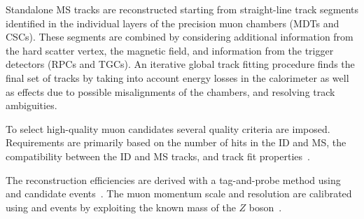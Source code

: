 Standalone MS tracks are reconstructed starting from straight-line track segments identified in the individual layers of the precision muon chambers (MDTs and CSCs). 
These segments are combined by considering additional information from the hard scatter vertex, the magnetic field, and information from the trigger detectors (RPCs and TGCs). An iterative global track fitting procedure finds the final set of tracks by taking into account energy losses in the calorimeter as well as effects due to possible misalignments of the chambers, and resolving track ambiguities. \cite{MUON-2018-03}

To select high-quality muon candidates several quality criteria are imposed. 
Requirements are primarily based on the number of hits in the ID and MS, the compatibility between the ID and MS tracks, and track fit properties~\cite{MUON-2018-03}.

The reconstruction efficiencies are derived with a tag-and-probe method using \Jpsimumu and \Zmumu candidate events~\cite{MUON-2018-03}. 
The muon momentum scale and resolution are calibrated using \Jpsimumu and \Zmumu events by exploiting the known mass of the $Z$ boson~\cite{PERF-2015-10}. 






